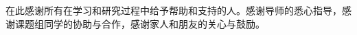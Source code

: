
\begin{acknowledgement}

在此感谢所有在学习和研究过程中给予帮助和支持的人。感谢导师的悉心指导，感谢课题组同学的协助与合作，感谢家人和朋友的关心与鼓励。

\end{acknowledgement}
